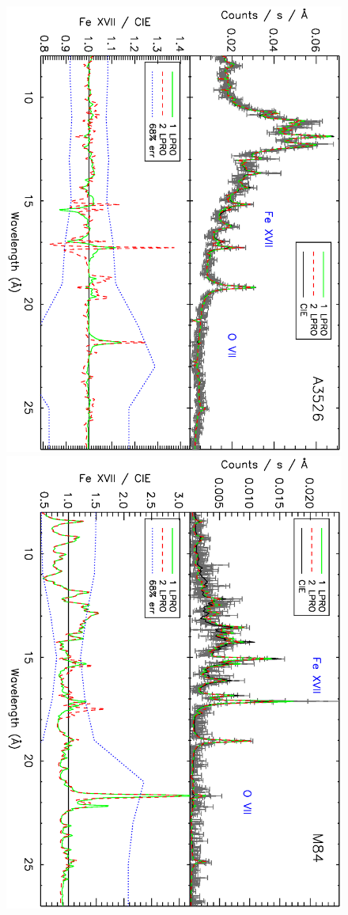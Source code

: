 \documentclass[useAMS,usenatbib]{mn2e}
\begin{document}
\begin{figure}
  \includegraphics[width=0.7\columnwidth, angle=90]{paper_ovii_fig01a.ps}
  \includegraphics[width=0.7\columnwidth, angle=90]{paper_ovii_fig01b.ps}

\end{figure}
\end{document}
